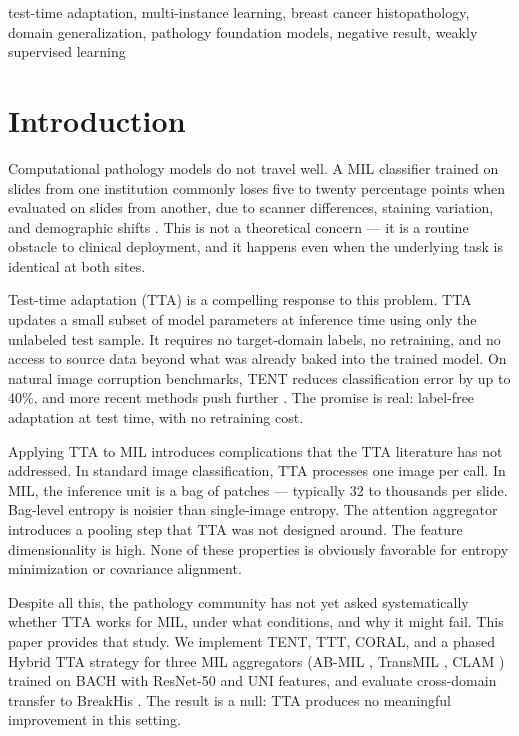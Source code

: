\documentclass[conference]{IEEEtran}
\begin{document}
\begin{IEEEkeywords}
test-time adaptation, multi-instance learning, breast cancer histopathology, domain generalization, pathology foundation models, negative result, weakly supervised learning
\end{IEEEkeywords}

\section{Introduction}

Computational pathology models do not travel well. A MIL classifier trained on slides from one institution commonly loses five to twenty percentage points when evaluated on slides from another, due to scanner differences, staining variation, and demographic shifts \cite{chen2022scaling, lu2021data}. This is not a theoretical concern --- it is a routine obstacle to clinical deployment, and it happens even when the underlying task is identical at both sites.

Test-time adaptation (TTA) is a compelling response to this problem. TTA updates a small subset of model parameters at inference time using only the unlabeled test sample. It requires no target-domain labels, no retraining, and no access to source data beyond what was already baked into the trained model. On natural image corruption benchmarks, TENT \cite{wang2021tent} reduces classification error by up to 40\%, and more recent methods push further \cite{niu2023towards, liu2021ttt}. The promise is real: label-free adaptation at test time, with no retraining cost.

Applying TTA to MIL introduces complications that the TTA literature has not addressed. In standard image classification, TTA processes one image per call. In MIL, the inference unit is a bag of patches --- typically 32 to thousands per slide. Bag-level entropy is noisier than single-image entropy. The attention aggregator introduces a pooling step that TTA was not designed around. The feature dimensionality is high. None of these properties is obviously favorable for entropy minimization or covariance alignment.

Despite all this, the pathology community has not yet asked systematically whether TTA works for MIL, under what conditions, and why it might fail. This paper provides that study. We implement TENT, TTT, CORAL, and a phased Hybrid TTA strategy for three MIL aggregators (AB-MIL \cite{ilse2018attention}, TransMIL \cite{shao2021transmil}, CLAM \cite{lu2021data}) trained on BACH \cite{aresta2019bach} with ResNet-50 and UNI \cite{chen2024uni} features, and evaluate cross-domain transfer to BreakHis \cite{spanhol2016dataset}. The result is a null: TTA produces no meaningful improvement in this setting.
\end{document}
